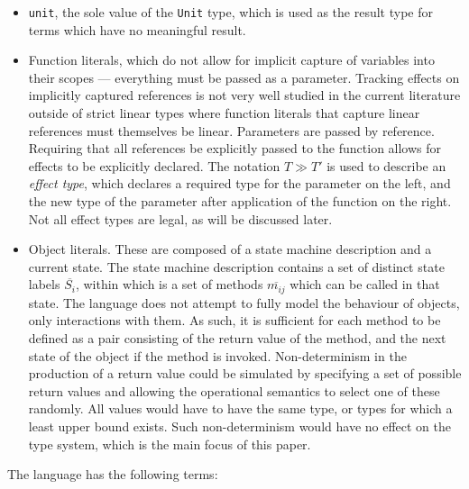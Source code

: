 \documentclass[preprint]{sigplanconf}
\begin{document}
\begin{itemize}
\item {\tt unit}, the sole value of the {\tt Unit} type, which is used as
the result type for terms which have no meaningful result.
\item Function literals, which do not allow for implicit capture
of variables into their scopes --- everything must be passed as a parameter.
Tracking effects on implicitly captured references is not very well
studied in the current literature outside of strict linear types where
function literals that capture linear references must themselves be linear.
Parameters are passed by reference. 
Requiring that all references be explicitly passed to the function allows for
effects to be explicitly declared. The notation $T \gg T'$ is used to
describe an {\it effect type}, which declares a required type for the parameter 
on the left, and the new type of the parameter after application of the function 
on the right. Not all effect types are legal, as will be discussed later.
\item Object literals. These are composed of a state machine description
and a current state. The state machine description contains a set of
distinct state labels $\overline{S_i}$, within which is a set of methods $\overline{m_{ij}}$ 
which can be called in that state. The language does
not attempt to fully model the behaviour of objects, only interactions with
them. As such, it is sufficient for each method to be defined as a pair 
consisting of the return value of the method, and the next state of the object 
if the method is invoked. Non-determinism in the production of a return value 
could be simulated by specifying a set of possible return values and allowing 
the operational semantics to select one of these randomly.
All values would have to have the same type, or types for which a least upper 
bound exists. Such non-determinism would have no effect on the type system,
which is the main focus of this paper.
\end{itemize}

\noindent
The language has the following terms:
\end{document}

